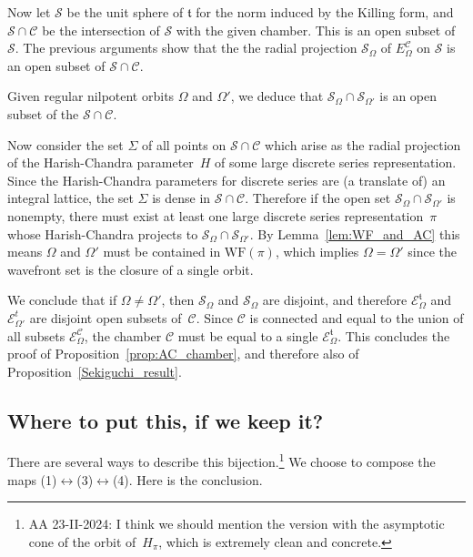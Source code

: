 \documentclass[10pt,leqno]{article}
\renewcommand{\t}{\mathfrak t}
\newcommand{\WF}{\mathrm{WF}}
\begin{document}
Now let $\mathcal{S}$ be the unit sphere of $\t$ for the norm induced by the Killing form, and $\mathcal{S} \cap \mathcal{C}$ be the intersection of $\mathcal{S}$ with the given chamber. This is an open subset of $\mathcal{S}$. The previous arguments show that the the radial projection $\mathcal{S}_{\Omega}$ of  $E^{\mathcal{C}}_\Omega$ on $\mathcal{S}$ is an open subset of $\mathcal{S} \cap \mathcal{C}$. 

Given regular nilpotent orbits $\Omega$ and $\Omega'$, we deduce that $\mathcal{S}_\Omega \cap \mathcal{S}_{\Omega'}$ is an open subset of the $\mathcal{S} \cap \mathcal{C}$.

Now consider the set $\Sigma$ of all points on $\mathcal{S} \cap \mathcal{C}$ which arise as the radial projection of the Harish-Chandra parameter~$H$ of some large discrete series representation. Since the Harish-Chandra parameters for discrete series are (a translate of) an integral lattice, the set $\Sigma$ is dense in $\mathcal{S} \cap \mathcal{C}$. Therefore if the open set $\mathcal{S}_\Omega \cap \mathcal{S}_{\Omega'}$ is nonempty, there must exist at least one large discrete series representation~$\pi$ whose Harish-Chandra projects to $\mathcal{S}_\Omega \cap \mathcal{S}_{\Omega'}$. By Lemma~\ref{lem:WF_and_AC} this means $\Omega$ and $\Omega'$ must be contained in $\WF(\pi)$, which implies $\Omega = \Omega'$ since the wavefront set is the closure of a single orbit. 

We conclude that if $\Omega \neq \Omega'$, then $\mathcal{S}_\Omega$ and $\mathcal{S}_\Omega$ are disjoint, and therefore $\mathcal{E}^\t_{\Omega}$ and $\mathcal{E}^t_{\Omega'}$ are disjoint open subsets of~$\mathcal{C}$. Since $\mathcal{C}$ is connected and equal to the union of all subsets $\mathcal{E}^{\mathcal{C}}_{\Omega}$, the chamber $\mathcal{C}$ must be equal to a single $\mathcal{E}^\t_\Omega$. This concludes the proof of Proposition~\ref{prop:AC_chamber}, and therefore also of Proposition~\ref{Sekiguchi_result}.


\subsection{Where to put this, if we keep it?}


There are several ways to describe this bijection.\footnote{AA 23-II-2024: I think we should mention the version with the asymptotic cone of the orbit of~$H_\pi$, which is extremely clean and concrete. } We choose to compose the maps (1)$\leftrightarrow$(3)$\leftrightarrow$(4).
Here is the conclusion.
\end{document}
